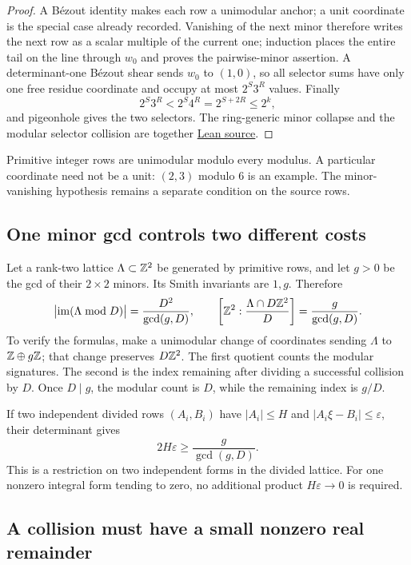 \documentclass[11pt]{article}
\begin{document}
\begin{proof}
A B\'ezout identity makes each row a unimodular anchor; a unit coordinate is the special case already recorded.  Vanishing of the
next minor therefore writes the next row as a scalar multiple of the current
one; induction places the entire tail on the line through $w_0$ and proves the
pairwise-minor assertion.  A determinant-one B\'ezout shear sends $w_0$ to
$(1,0)$, so all selector sums have only one free residue coordinate and occupy
at most $2^S3^R$ values.  Finally
\[
 2^S3^R<2^S4^R=2^{S+2R}\le2^k,
\]
and pigeonhole gives the two selectors.
The ring-generic minor collapse and the modular selector collision are
together \href{https://github.com/wcook04/plectis-erdos/blob/f36a98bf3d3e6f65f1074e3b800e3293d5b8a51a/ErdosProblems/Erdos1049/PaperFiniteAssembliesR7.lean#L269}{Lean source}.
\end{proof}

Primitive integer rows are unimodular modulo every modulus.  A particular
coordinate need not be a unit: $(2,3)$ modulo $6$ is an example.  The
minor-vanishing hypothesis remains a separate condition on the source rows.

\subsection{One minor gcd controls two different costs}

Let a rank-two lattice $\Lambda\subset\mathbb{Z}^2$ be generated by primitive rows,
and let $g>0$ be the gcd of their $2\times2$ minors.  Its Smith invariants are
$1,g$.  Therefore
\[
 \bigl|\operatorname{im}(\Lambda\bmod D)\bigr|
       =\frac{D^2}{\gcd(g,D)},\qquad
 \left[\mathbb{Z}^2:\frac{\Lambda\cap D\mathbb{Z}^2}{D}\right]
       =\frac{g}{\gcd(g,D)}.
\]
To verify the formulas, make a unimodular change of coordinates sending
$\Lambda$ to $\mathbb{Z}\oplus g\mathbb{Z}$; that change preserves $D\mathbb{Z}^2$.
The first quotient counts the modular signatures.  The second is the index
remaining after dividing a successful collision by $D$.
Once $D\mid g$, the modular count is $D$, while the remaining index is $g/D$.

If two independent divided rows $(A_i,B_i)$ have $|A_i|\le H$ and
$|A_i\xi-B_i|\le\varepsilon$, their determinant gives
\[
 2H\varepsilon\ge \frac{g}{\gcd(g,D)}.
\]
This is a restriction on two independent forms in the divided lattice.
For one nonzero integral form tending to zero, no additional product
$H\varepsilon\to0$ is required.

\subsection{A collision must have a small nonzero real remainder}
\end{document}

